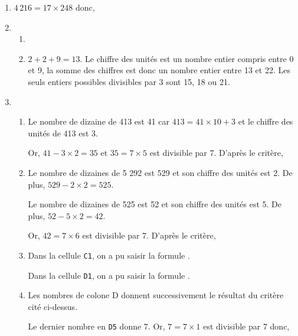 \begin{enumerate}
    \item $4\,216 =17\times248$ donc, 
    \item
       \begin{enumerate}
          \item {}
          \item $2+2+9 =13$. Le chiffre des unités est un nombre entier compris entre 0 et 9, la somme des chiffres est donc un nombre entier entre 13 et 22. Les seuls entiers possibles divisibles par 3 sont 15, 18 ou 21. \par
       \end{enumerate}
    \item 
       \begin{enumerate}
          \item Le nombre de dizaine de 413 est 41 car $413 =41\times10+3$ et le chiffre des unités de 413 est 3. \par
             Or, $41-3\times2 =35$ et $35 =7\times5$ est divisible par 7. D'après le critère, 
          \item Le nombre de dizaines de 5 292 est 529 et son chiffre des unités est 2. De plus, $529-2\times2 =525$. \par
             Le nombre de dizaines de 525 est 52 et son chiffre des unités est 5. De plus, $52-5\times2 =42$. \par
             Or, $42 =7\times6$ est divisible par 7. D'après le critère, 
          \item Dans la cellule \texttt{C1}, on a pu saisir la formule . \par
             Dans la cellule \texttt{D1}, on a pu saisir la formule . \par
          \item Les nombres de colone D donnent successivement le résultat du critère cité ci-dessus. \par
             Le dernier nombre en \texttt{D5} donne 7. Or, $7 =7\times1$ est divisible par 7 donc, 
       \end{enumerate}
 \end{enumerate}